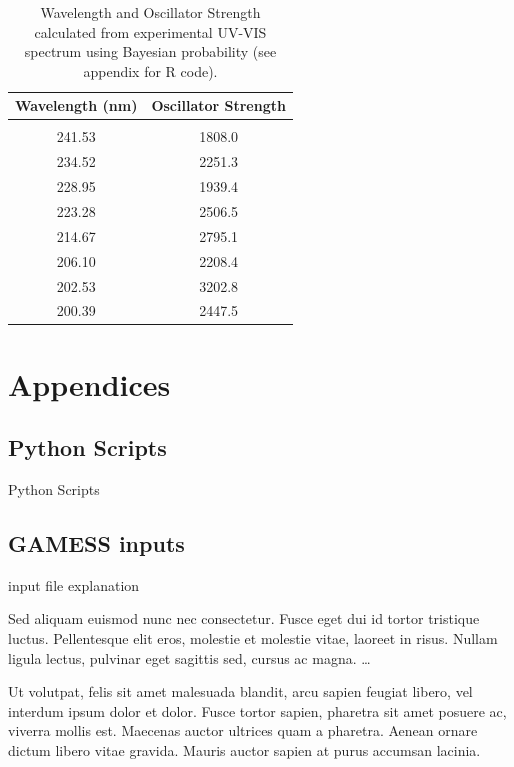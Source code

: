 \documentclass[
journal=jacsat, %
manuscript=article]{achemso}
\begin{document}
\begin{table}[ht]
	\caption{Wavelength and Oscillator Strength calculated from experimental UV-VIS spectrum using Bayesian probability (see appendix for R code).}
	\label{table:anilineUVTable}
	\centering
	\begin{tabular}{c c}
		Wavelength (nm) & Oscillator Strength\\ [1ex] %
		\hline\hline
		\\[-0.5ex]
		241.53&1808.0\\ 
		234.52&2251.3\\
		228.95&1939.4\\
		223.28&2506.5\\ 
		214.67&2795.1\\
		206.10&2208.4\\
		202.53&3202.8\\
		200.39&2447.5\\[1ex]
	\end{tabular}
\end{table}

\clearpage
\appendix 
\section{Appendices}
	\subsection{Python Scripts}
Python Scripts 

	\subsection{GAMESS inputs}
input file explanation


\acknowledgement

Sed aliquam euismod nunc nec consectetur. Fusce eget dui id tortor tristique luctus. Pellentesque elit eros, molestie et molestie vitae, laoreet in risus. Nullam ligula lectus, pulvinar eget sagittis sed, cursus ac magna. \ldots


\suppinfo

Ut volutpat, felis sit amet malesuada blandit, arcu sapien feugiat libero, vel interdum ipsum dolor et dolor. Fusce tortor sapien, pharetra sit amet posuere ac, viverra mollis est. Maecenas auctor ultrices quam a pharetra. Aenean ornare dictum libero vitae gravida. Mauris auctor sapien at purus accumsan lacinia.


\end{document}

